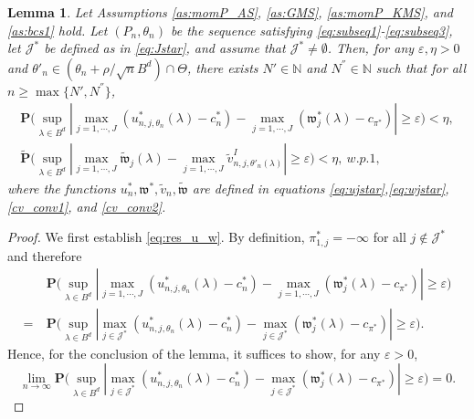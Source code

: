 \documentclass[letterpaper,11pt]{article}
\theoremstyle{myplain}
\newtheorem{lemma}{Lemma}[section]
\theoremstyle{mydefinition}
\theoremstyle{myremark}
\newcommand{\cJ}{\mathcal{J}}
\newcommand{\thetnprime}{(\theta_n +\rho /\sqrt{n} B^d)\cap \Theta}
\numberwithin{equation}{section}
\numberwithin{figure}{section}
\begin{document}
\begin{appendices}
\begin{lemma}\label{lem:res}
Let Assumptions \ref{as:momP_AS}, \ref{as:GMS}, \ref{as:momP_KMS}, and \ref{as:bcs1} hold. 
Let $(P_n,\theta_n)$ be the sequence satisfying  \eqref{eq:subseq1}-\eqref{eq:subseq3}, let $\mathcal J^*$ be defined as in \eqref{eq:Jstar}, and assume that $\cJ^* \neq \emptyset$. 
	Then, for any 
	$\varepsilon,\eta>0$ and $\theta'_n\in \thetnprime$, there exists $N'\in\mathbb N$ and $N^{''} \in\mathbb N$ such that for all $n \ge \max\{N',N^{''}\}$,
\begin{align}
	\mathbf{P}\Bigg(\sup_{\lambda\in  B^d } \left\vert \max_{j=1,\cdots,J}(u^*_{n,j,\theta_{n}}(\lambda)-c_{n}^{*})-\max_{j=1,\cdots,J}(\mathfrak{w}_{j}^*(\lambda)-c_{\pi^*}) \right\vert\ge\varepsilon\Bigg)<\eta,\label{eq:res_u_w}\\
	\mathbf{\tilde{P}}\Bigg(\sup_{\lambda\in  B^d} \left\vert \max_{j=1,\cdots,J}\tilde{\mathfrak{w}}_{j}(\lambda)-\max_{j=1,\cdots,J}\tilde v^I_{n,j,\theta'_{n}(\lambda)} \right\vert\ge\varepsilon \Bigg)<\eta,~w.p. 1,\label{eq:res_w_v}
\end{align}
where the functions $u^*_n,\mathfrak w^*,\tilde v_n,\tilde{\mathfrak w}$ are defined in equations \eqref{eq:ujstar},\eqref{eq:wjstar}, \eqref{cv_conv1}, and \eqref{cv_conv2}. 
\end{lemma}

\begin{proof}
We first establish \eqref{eq:res_u_w}. By definition,
 $\pi_{1,j}^*= -\infty$ for all $j\notin\mathcal J^*$ and therefore
\begin{align}
	&~\mathbf{P}\Big(\sup_{\lambda\in  B^d }|\max_{j=1,\cdots,J}(u^*_{n,j,\theta_{n}}(\lambda)-c^{*}_{n})-\max_{j=1,\cdots,J}(\mathfrak{w}_{j}^*(\lambda)-c_{\pi^*})|\ge\varepsilon \Big)\\
	=&~\mathbf{P}\Big(\sup_{\lambda\in  B^d }|\max_{j\in\mathcal J^*}(u^*_{n,j,\theta_{n}}(\lambda)-c^{*}_{n})-\max_{j\in\mathcal J^*}(\mathfrak{w}_{j}^*(\lambda)-c_{\pi^*})|\ge\varepsilon \Big).\label{eq:res4}
	
\end{align}
Hence, for the conclusion of the lemma, it suffices to show, for any $\varepsilon>0$,
\[\lim_{n\to\infty}\mathbf{P}\Big(\sup_{\lambda\in  B^d }|\max_{j\in\mathcal J^*}(u^*_{n,j,\theta_{n}}(\lambda)-c^{*}_{n})-\max_{j\in\mathcal J^*}(\mathfrak{w}_{j}^*(\lambda)-c_{\pi^*})|\ge\varepsilon \Big)=0.\]


\end{proof}
\end{appendices}
\end{document}
